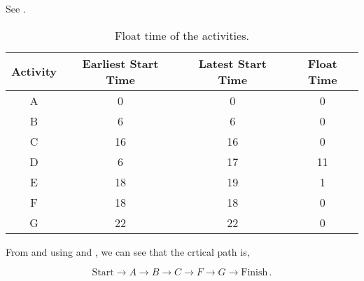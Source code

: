 \begin{subquestions}
\subquestion

\begin{subsubquestions}


\subsubquestion

See .

\begin{table}[ht]
	\centering
	\begin{tabular}{|c|c|c|c|}
		\hline
		Activity & Earliest Start Time & Latest Start Time & Float Time \\
		\hline
		A & 0 & 0 & 0 \\
		B & 6 & 6 & 0 \\
		C & 16 & 16 & 0 \\
		D & 6 & 17 & 11 \\
		E & 18 & 19 & 1 \\
		F & 18 & 18 & 0 \\
		G & 22 & 22 & 0 \\
		\hline
	\end{tabular}
	\caption{\label{2011:q2:tab:CritPath} Float time of the activities.}
\end{table}


\subsubquestion

From  and using  and , we can see that the crtical path is,

\begin{equation}
	\text{Start} \rightarrow A \rightarrow B \rightarrow C \rightarrow F \rightarrow G \rightarrow \text{Finish}\,.
\end{equation}

\end{subsubquestions}

\end{subquestions}


